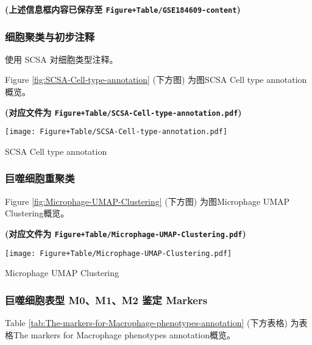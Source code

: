 \documentclass[
]{article}
\begin{document}
\textbf{(上述信息框内容已保存至 \texttt{Figure+Table/GSE184609-content})}

\hypertarget{ux7ec6ux80deux805aux7c7bux4e0eux521dux6b65ux6ce8ux91ca}{%
\subsubsection{细胞聚类与初步注释}\label{ux7ec6ux80deux805aux7c7bux4e0eux521dux6b65ux6ce8ux91ca}}

使用 SCSA 对细胞类型注释。

Figure \ref{fig:SCSA-Cell-type-annotation} (下方图) 为图SCSA Cell type annotation概览。

\textbf{(对应文件为 \texttt{Figure+Table/SCSA-Cell-type-annotation.pdf})}

\def\@captype{figure}
\begin{center}
\texttt{[image: Figure+Table/SCSA-Cell-type-annotation.pdf]}
\caption{SCSA Cell type annotation}\label{fig:SCSA-Cell-type-annotation}
\end{center}

\hypertarget{ux5de8ux566cux7ec6ux80deux91cdux805aux7c7b}{%
\subsubsection{巨噬细胞重聚类}\label{ux5de8ux566cux7ec6ux80deux91cdux805aux7c7b}}

Figure \ref{fig:Microphage-UMAP-Clustering} (下方图) 为图Microphage UMAP Clustering概览。

\textbf{(对应文件为 \texttt{Figure+Table/Microphage-UMAP-Clustering.pdf})}

\def\@captype{figure}
\begin{center}
\texttt{[image: Figure+Table/Microphage-UMAP-Clustering.pdf]}
\caption{Microphage UMAP Clustering}\label{fig:Microphage-UMAP-Clustering}
\end{center}

\hypertarget{ux5de8ux566cux7ec6ux80deux8868ux578b-m0m1m2-ux9274ux5b9a-markers}{%
\subsubsection{巨噬细胞表型 M0、M1、M2 鉴定 Markers}\label{ux5de8ux566cux7ec6ux80deux8868ux578b-m0m1m2-ux9274ux5b9a-markers}}

Table \ref{tab:The-markers-for-Macrophage-phenotypes-annotation} (下方表格) 为表格The markers for Macrophage phenotypes annotation概览。
\end{document}

